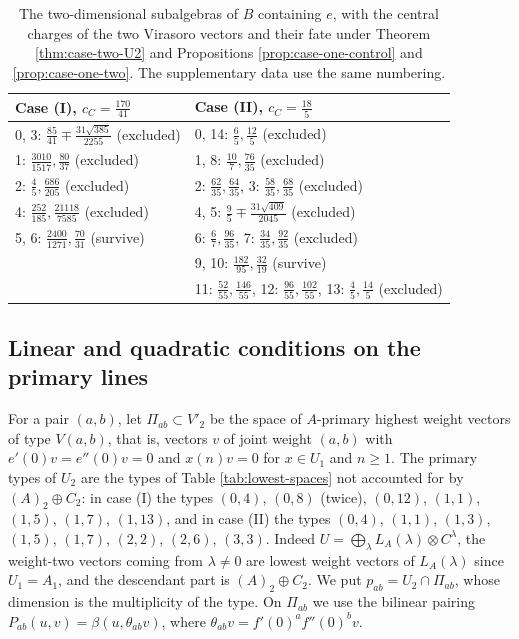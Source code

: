 \documentclass[leqno]{article}
\renewcommand{\geq}{\ensuremath{\geqslant}}
\newcommand{\ot}{\otimes}
\numberwithin{equation}{section}
\begin{document}
\begin{table}[ht]
\centering
\small
\begin{tabular}{l|l}
Case (I), $c_C = \frac{170}{41}$ & Case (II), $c_C = \frac{18}{5}$\\
\hline
0, 3: $\frac{85}{41} \mp \frac{31\sqrt{385}}{2255}$ \quad (excluded) & 0, 14: $\frac65,\frac{12}5$ \quad (excluded)\\
1: $\frac{3010}{1517},\frac{80}{37}$ \quad (excluded) & 1, 8: $\frac{10}{7},\frac{76}{35}$ \quad (excluded)\\
2: $\frac45,\frac{686}{205}$ \quad (excluded) & 2: $\frac{62}{35},\frac{64}{35}$, 3: $\frac{58}{35},\frac{68}{35}$ \quad (excluded)\\
4: $\frac{252}{185},\frac{21118}{7585}$ \quad (excluded) & 4, 5: $\frac95 \mp \frac{31\sqrt{409}}{2045}$ \quad (excluded)\\
5, 6: $\frac{2400}{1271},\frac{70}{31}$ \quad (survive) & 6: $\frac67,\frac{96}{35}$, 7: $\frac{34}{35},\frac{92}{35}$ \quad (excluded)\\
 & 9, 10: $\frac{182}{95},\frac{32}{19}$ \quad (survive)\\
 & 11: $\frac{52}{55},\frac{146}{55}$, 12: $\frac{96}{55},\frac{102}{55}$, 13: $\frac45,\frac{14}5$ \quad (excluded)
\end{tabular}
\caption{The two-dimensional subalgebras of $B$ containing $e$, with the central charges of the two Virasoro vectors and their fate under Theorem \ref{thm:case-two-U2} and Propositions \ref{prop:case-one-control} and \ref{prop:case-one-two}. The supplementary data use the same numbering.}
\label{tab:griess}
\end{table}

\subsection{Linear and quadratic conditions on the primary lines}

For a pair $(a,b)$, let $\Pi_{ab} \subset V'_2$ be the space of $A$-primary highest weight vectors of type $V(a,b)$, that is, vectors $v$ of joint weight $(a,b)$ with $e'(0)v = e''(0)v = 0$ and $x(n)v = 0$ for $x \in U_1$ and $n \geq 1$. The primary types of $U_2$ are the types of Table \ref{tab:lowest-spaces} not accounted for by $(A)_2 \oplus C_2$: in case (I) the types $(0,4)$, $(0,8)$ (twice), $(0,12)$, $(1,1)$, $(1,5)$, $(1,7)$, $(1,13)$, and in case (II) the types $(0,4)$, $(1,1)$, $(1,3)$, $(1,5)$, $(1,7)$, $(2,2)$, $(2,6)$, $(3,3)$. Indeed $U = \bigoplus_\lambda L_A(\lambda) \ot C^\lambda$, the weight-two vectors coming from $\lambda \neq 0$ are lowest weight vectors of $L_A(\lambda)$ since $U_1 = A_1$, and the descendant part is $(A)_2 \oplus C_2$. We put $p_{ab} = U_2 \cap \Pi_{ab}$, whose dimension is the multiplicity of the type. On $\Pi_{ab}$ we use the bilinear pairing $P_{ab}(u,v) = \beta(u,\theta_{ab}v)$, where $\theta_{ab}v = f'(0)^a f''(0)^b v$.
\end{document}
